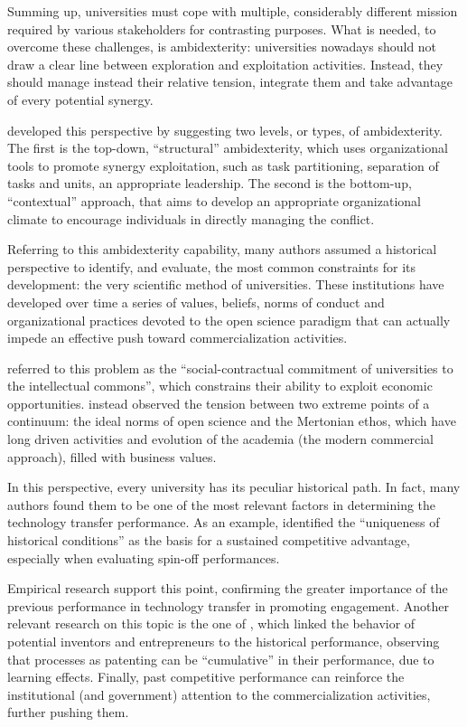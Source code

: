 Summing up, universities must cope with multiple, considerably different mission required by various stakeholders for contrasting purposes. What is needed, to overcome these challenges, is ambidexterity: universities nowadays should not draw a clear line between exploration and exploitation activities. Instead, they should manage instead their relative tension, integrate them and take advantage of every potential synergy.

\citet{Chang2016} developed this perspective by suggesting two levels, or types, of ambidexterity. The first is the top-down, \enquote{structural} ambidexterity, which uses organizational tools to promote synergy exploitation, such as task partitioning, separation of tasks and units, an appropriate leadership. The second is the bottom-up, \enquote{contextual} approach, that aims to develop an appropriate organizational climate to encourage individuals in directly managing the conflict.

Referring to this ambidexterity capability, many authors assumed a historical perspective to identify, and evaluate, the most common constraints for its development: the very scientific method of universities. These institutions have developed over time a series of values, beliefs, norms of conduct and organizational practices devoted to the open science paradigm that can actually impede an effective push toward commercialization activities. 

\citet{Argyres1998} referred to this problem as the \enquote{social-contractual commitment of universities to the intellectual commons}, which constrains their ability to exploit economic opportunities. \citet{Muscio2013} instead observed the tension between two extreme points of a continuum: the ideal norms of open science and the Mertonian ethos, which have long driven activities and evolution of the academia (the modern commercial approach), filled with business values.

In this perspective, every university has its peculiar historical path. In fact, many authors found them to be one of the most relevant factors in determining the technology transfer performance. As an example, \citet{OShea2005} identified the \enquote{uniqueness of historical conditions} as the basis for a sustained competitive advantage, especially when evaluating spin-off performances. 

Empirical research support this point, confirming the greater importance of the previous performance in technology transfer in promoting engagement. Another relevant research on this topic is the one of \citet{Baldini2006}, which linked the behavior of potential inventors and entrepreneurs to the historical performance, observing that processes as patenting can be \enquote{cumulative} in their performance, due to learning effects. Finally, past competitive performance can reinforce the institutional (and government) attention to the commercialization activities, further pushing them.

